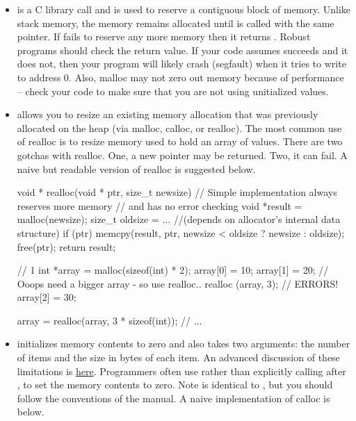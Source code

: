 \begin{itemize}
\item {} is a C library call and is used to reserve a contiguous block of memory. Unlike stack memory, the memory remains allocated until  is called with the same pointer. If  fails to reserve any more memory then it returns . Robust programs should check the return value. If your code assumes  succeeds and it does not, then your program will likely crash (segfault) when it tries to write to address 0. Also, malloc may not zero out memory because of performance -- check your code to make sure that you are not using unitialized values.
\item {} allows you to resize an existing memory allocation that was previously allocated on the heap (via malloc, calloc, or realloc). The most common use of realloc is to resize memory used to hold an array of values. There are two gotchas with realloc. One, a new pointer may be returned. Two, it can fail. A naive but readable version of realloc is suggested below. 

\begin{code}[language=C]
void * realloc(void * ptr, size_t newsize) {
  // Simple implementation always reserves more memory
  // and has no error checking
  void *result = malloc(newsize); 
  size_t oldsize =  ... //(depends on allocator's internal data structure)
  if (ptr) memcpy(result, ptr, newsize < oldsize ? newsize : oldsize);
  free(ptr);
  return result;
}
\end{code}

\begin{code}[language=C]
// 1
int *array = malloc(sizeof(int) * 2);
array[0] = 10; array[1] = 20;
// Ooops need a bigger array - so use realloc..
realloc (array, 3); // ERRORS!
array[2] = 30; 

array = realloc(array, 3 * sizeof(int));
// ...
\end{code}

\item {} initializes memory contents to zero and also takes two arguments: the number of items and the size in bytes of each item. An advanced discussion of these limitations is \href{http://locklessinc.com/articles/calloc/}{here}. Programmers often use  rather than explicitly calling  after , to set the memory contents to zero. Note  is identical to , but you should follow the conventions of the manual. A naive implementation of calloc is below.


\end{itemize}
